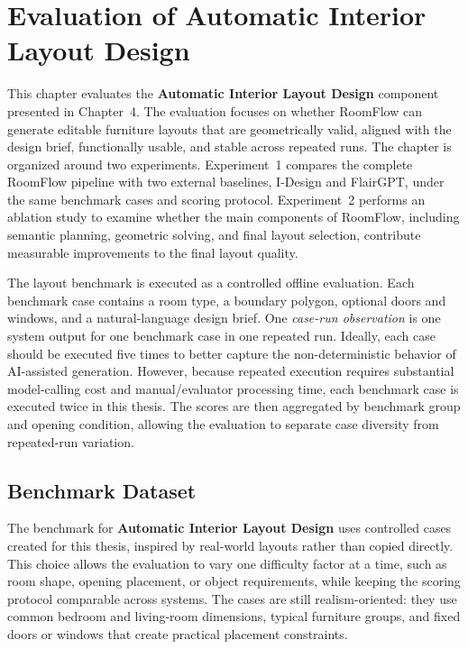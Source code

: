 \chapter{Evaluation of Automatic Interior Layout Design}
\label{chap:layout-evaluation}

This chapter evaluates the \textbf{Automatic Interior Layout Design} component presented in Chapter~4. The evaluation focuses on whether RoomFlow can generate editable furniture layouts that are geometrically valid, aligned with the design brief, functionally usable, and stable across repeated runs. The chapter is organized around two experiments. Experiment~1 compares the complete RoomFlow pipeline with two external baselines, I-Design and FlairGPT, under the same benchmark cases and scoring protocol. Experiment~2 performs an ablation study to examine whether the main components of RoomFlow, including semantic planning, geometric solving, and final layout selection, contribute measurable improvements to the final layout quality.

The layout benchmark is executed as a controlled offline evaluation. Each benchmark case contains a room type, a boundary polygon, optional doors and windows, and a natural-language design brief. One \emph{case-run observation} is one system output for one benchmark case in one repeated run. Ideally, each case should be executed five times to better capture the non-deterministic behavior of AI-assisted generation. However, because repeated execution requires substantial model-calling cost and manual/evaluator processing time, each benchmark case is executed twice in this thesis. The scores are then aggregated by benchmark group and opening condition, allowing the evaluation to separate case diversity from repeated-run variation.

\section{Benchmark Dataset}\label{subsec:eval-layout-benchmark-cases}

The benchmark for \textbf{Automatic Interior Layout Design} uses controlled cases created for this thesis, inspired by real-world layouts rather than copied directly. This choice allows the evaluation to vary one difficulty factor at a time, such as room shape, opening placement, or object requirements, while keeping the scoring protocol comparable across systems. The cases are still realism-oriented: they use common bedroom and living-room dimensions, typical furniture groups, and fixed doors or windows that create practical placement constraints.

